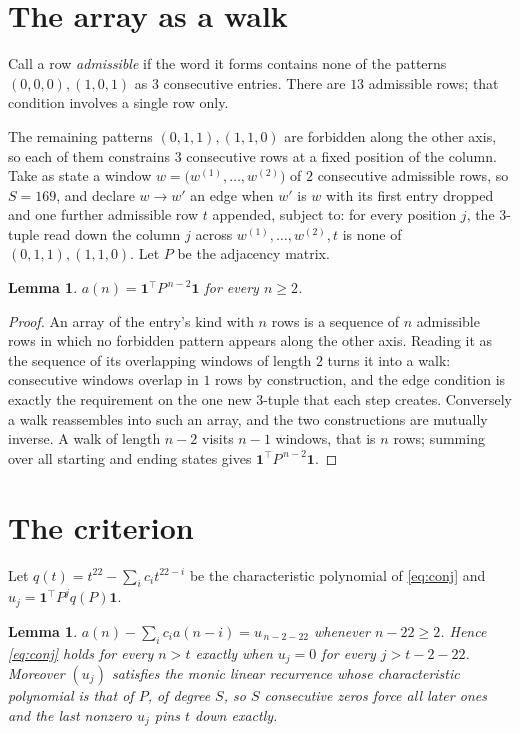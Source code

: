 \documentclass[11pt,a4paper]{article}
\theoremstyle{plain}
\newtheorem{lemma}[theorem]{Lemma}
\theoremstyle{definition}
\begin{document}
\section{The array as a walk}

Call a row \emph{admissible} if the word it forms contains none of the patterns
$(0,0,0), (1,0,1)$ as $3$ consecutive entries. There are $13$ admissible rows; that condition
involves a single row only.

The remaining patterns $(0,1,1), (1,1,0)$ are forbidden along the other axis, so each of them
constrains $3$ consecutive rows at a fixed position of the column. Take as state a
window $w=\bigl(w^{(1)},\dots,w^{(2)}\bigr)$ of $2$ consecutive admissible
rows, so $S=169$, and declare $w\to w'$ an edge when $w'$ is $w$ with its first entry
dropped and one further admissible row $t$ appended, subject to: for every position
$j$, the $3$-tuple read down the column $j$ across $w^{(1)},\dots,w^{(2)},t$
is none of $(0,1,1), (1,1,0)$. Let $P$ be the adjacency matrix.

\begin{lemma}\label{lem:walk}
$a(n)=\mathbf{1}^{\!\top}P^{\,n-2}\mathbf{1}$ for every $n\ge2$.
\end{lemma}

\begin{proof}
An array of the entry's kind with $n$ rows is a sequence of $n$ admissible rows in
which no forbidden pattern appears along the other axis. Reading it as the sequence of its
overlapping windows of length $2$ turns it into a walk: consecutive windows overlap in
$1$ rows by construction, and the edge condition is exactly the requirement on the one
new $3$-tuple that each step creates. Conversely a walk reassembles into such an array,
and the two constructions are mutually inverse. A walk of length $n-2$ visits $n-1$
windows, that is $n$ rows; summing over all starting and ending states gives
$\mathbf{1}^{\!\top}P^{\,n-2}\mathbf{1}$.
\end{proof}

\section{The criterion}

Let $q(t)=t^{22}-\sum_i c_i t^{22-i}$ be the characteristic polynomial of
\eqref{eq:conj} and $u_j=\mathbf{1}^{\!\top}P^{j}q(P)\mathbf{1}$.

\begin{lemma}\label{lem:crit}
$a(n)-\sum_i c_i a(n-i)=u_{\,n-2-22}$ whenever $n-22\ge2$. Hence
\eqref{eq:conj} holds for every $n>t$ exactly when $u_j=0$ for every
$j>t-2-22$. Moreover $(u_j)$ satisfies the monic linear recurrence whose
characteristic polynomial is that of $P$, of degree $S$, so $S$ consecutive zeros force all
later ones and the last nonzero $u_j$ pins $t$ down exactly.
\end{lemma}
\end{document}
